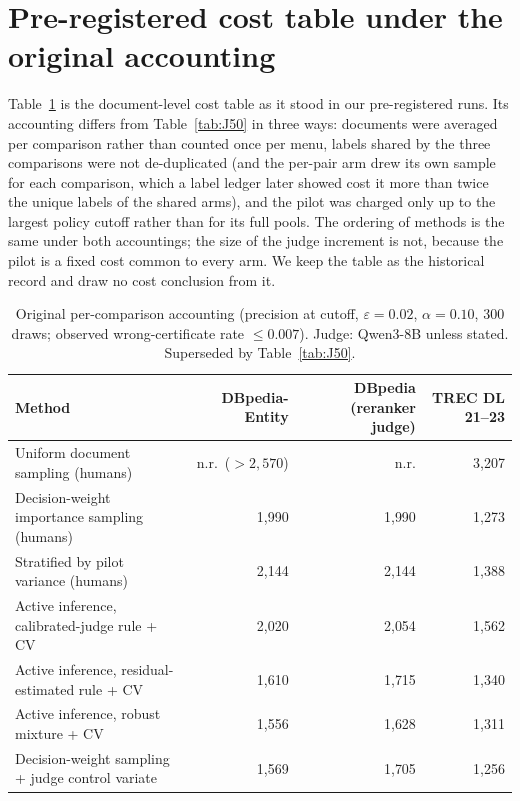 \documentclass{article}
\newcommand{\eps}{\varepsilon}
\begin{document}
\section{Pre-registered cost table under the original accounting}\label{app:legacy}
Table~\ref{tab:J50legacy} is the document-level cost table as it stood in our pre-registered runs. Its accounting differs from Table~\ref{tab:J50} in three ways: documents were averaged per comparison rather than counted once per menu, labels shared by the three comparisons were not de-duplicated (and the per-pair arm drew its own sample for each comparison, which a label ledger later showed cost it more than twice the unique labels of the shared arms), and the pilot was charged only up to the largest policy cutoff rather than for its full pools. The ordering of methods is the same under both accountings; the size of the judge increment is not, because the pilot is a fixed cost common to every arm. We keep the table as the historical record and draw no cost conclusion from it.

\begin{table}[htbp]\centering\footnotesize
\caption{Original per-comparison accounting (precision at cutoff, $\eps=0.02$, $\alpha=0.10$, 300 draws; observed wrong-certificate rate $\le0.007$). Judge: Qwen3-8B unless stated. Superseded by Table~\ref{tab:J50}.}\label{tab:J50legacy}
\begin{tabular}{lrrr}\toprule
Method & DBpedia-Entity & DBpedia (reranker judge) & TREC DL 21--23\\\midrule
Uniform document sampling (humans) & n.r.\ ($>2{,}570$) & n.r. & 3{,}207\\
Decision-weight importance sampling (humans) & 1{,}990 & 1{,}990 & 1{,}273\\
Stratified by pilot variance (humans) & 2{,}144 & 2{,}144 & 1{,}388\\
Active inference, calibrated-judge rule + CV & 2{,}020 & 2{,}054 & 1{,}562\\
Active inference, residual-estimated rule + CV & 1{,}610 & 1{,}715 & 1{,}340\\
Active inference, robust mixture + CV & 1{,}556 & 1{,}628 & 1{,}311\\
Decision-weight sampling + judge control variate & 1{,}569 & 1{,}705 & 1{,}256\\\bottomrule
\end{tabular}
\end{table}
\end{document}
